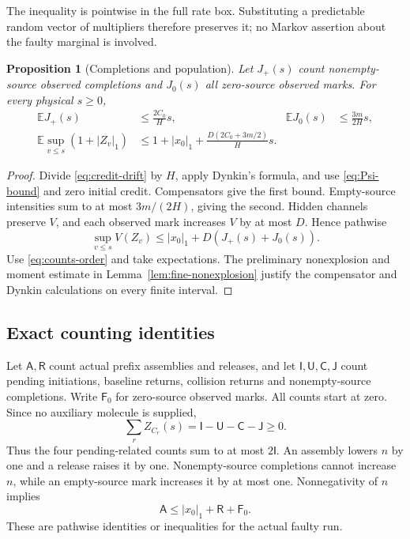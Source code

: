 \documentclass[11pt,reqno]{amsart}
\newtheorem{proposition}[theorem]{Proposition}
\theoremstyle{definition}
\theoremstyle{remark}
\newcommand{\E}{\mathbb E}
\begin{document}
The inequality is pointwise in the full rate box. Substituting a predictable
random vector of multipliers therefore preserves it; no Markov assertion
about the faulty marginal is involved.

\begin{proposition}[Completions and population]\label{prop:global-pop}
Let $J_+(s)$ count nonempty-source observed completions and $J_0(s)$ all
zero-source observed marks. For every physical $s\ge0$,
\begin{align}
 \E J_+(s)&\le\frac{2C_0}{H}s,&
 \E J_0(s)&\le\frac{3m}{2H}s,\label{eq:J-bounds}\\
 \E\sup_{v\le s}(1+|Z_v|_1)
 &\le1+|x_0|_1+
       \frac{D(2C_0+3m/2)}{H}s.\label{eq:actual-pop-bound}
\end{align}
\end{proposition}
\begin{proof}
Divide \eqref{eq:credit-drift} by $H$, apply Dynkin's formula, and use
\eqref{eq:Psi-bound} and zero initial credit. Compensators give the first
bound. Empty-source intensities sum to at most $3m/(2H)$, giving the second.
Hidden channels preserve $V$, and each observed mark increases $V$ by at most
$D$. Hence pathwise
\[
 \sup_{v\le s}V(Z_v)\le |x_0|_1+D(J_+(s)+J_0(s)).
\]
Use \eqref{eq:counts-order} and take expectations. The preliminary
nonexplosion and moment estimate in Lemma~\ref{lem:fine-nonexplosion} justify
the compensator and Dynkin calculations on every finite interval.
\end{proof}

\subsection{Exact counting identities}
Let $\mathsf A,\mathsf R$ count actual prefix assemblies and releases, and let
$\mathsf I,\mathsf U,\mathsf C,\mathsf J$ count pending initiations, baseline
returns, collision returns and nonempty-source completions. Write $\mathsf F_0$
for zero-source observed marks. All counts start at zero. Since no auxiliary
molecule is supplied,
\begin{equation}\label{eq:pending-count}
 \sum_r Z_{C_r}(s)=\mathsf I-\mathsf U-\mathsf C-\mathsf J\ge0.
\end{equation}
Thus the four pending-related counts sum to at most $2\mathsf I$.
An assembly lowers $n$ by one and a release raises it by one. Nonempty-source
completions cannot increase $n$, while an empty-source mark increases it by at
most one. Nonnegativity of $n$ implies
\begin{equation}\label{eq:assembly-count}
 \mathsf A\le |x_0|_1+\mathsf R+\mathsf F_0.
\end{equation}
These are pathwise identities or inequalities for the actual faulty run.
\end{document}
